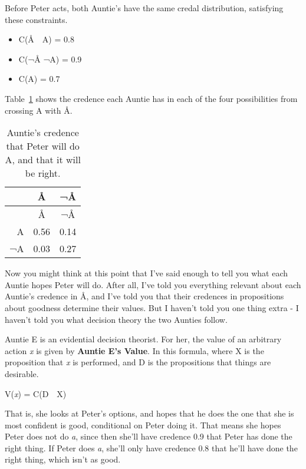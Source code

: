 \documentclass[
  11pt,
  letterpaper,
  DIV=11,
  numbers=noendperiod,
  twoside]{scrartcl}
\providecommand{\tightlist}{%
  \setlength{\itemsep}{0pt}\setlength{\parskip}{0pt}}
\begin{document}
Before Peter acts, both Auntie's have the same credal distribution,
satisfying these constraints.

\begin{itemize}
\tightlist
\item
  C(Å~\textbar~A) = 0.8
\item
  C(¬Å \textbar{} ¬A) = 0.9
\item
  C(A) = 0.7
\end{itemize}

Table~\ref{tbl-credence} shows the credence each Auntie has in each of
the four possibilities from crossing A with Å.

\begin{longtable}[]{@{}rcc@{}}
\caption{Auntie's credence that Peter will do A, and that it will be
right.}\label{tbl-credence}\tabularnewline
\toprule\noalign{}
& Å & ¬Å \\
\midrule\noalign{}
\endfirsthead
\toprule\noalign{}
& Å & ¬Å \\
\midrule\noalign{}
\endhead
\bottomrule\noalign{}
\endlastfoot
A & 0.56 & 0.14 \\
¬A & 0.03 & 0.27 \\
\end{longtable}

Now you might think at this point that I've said enough to tell you what
each Auntie hopes Peter will do. After all, I've told you everything
relevant about each Auntie's credence in Å, and I've told you that their
credences in propositions about goodness determine their values. But I
haven't told you one thing extra - I haven't told you what decision
theory the two Aunties follow.

Auntie E is an evidential decision theorist. For her, the value of an
arbitrary action \emph{x} is given by \textbf{Auntie E's Value}. In this
formula, where X is the proposition that \emph{x} is performed, and D is
the propositions that things are desirable.

\begin{description}
\tightlist
\item[Auntie E's Value]
V(\emph{x}) = C(D~\textbar~X)
\end{description}

That is, she looks at Peter's options, and hopes that he does the one
that she is most confident is good, conditional on Peter doing it. That
means she hopes Peter does not do \emph{a}, since then she'll have
credence 0.9 that Peter has done the right thing. If Peter does
\emph{a}, she'll only have credence 0.8 that he'll have done the right
thing, which isn't as good.
\end{document}

